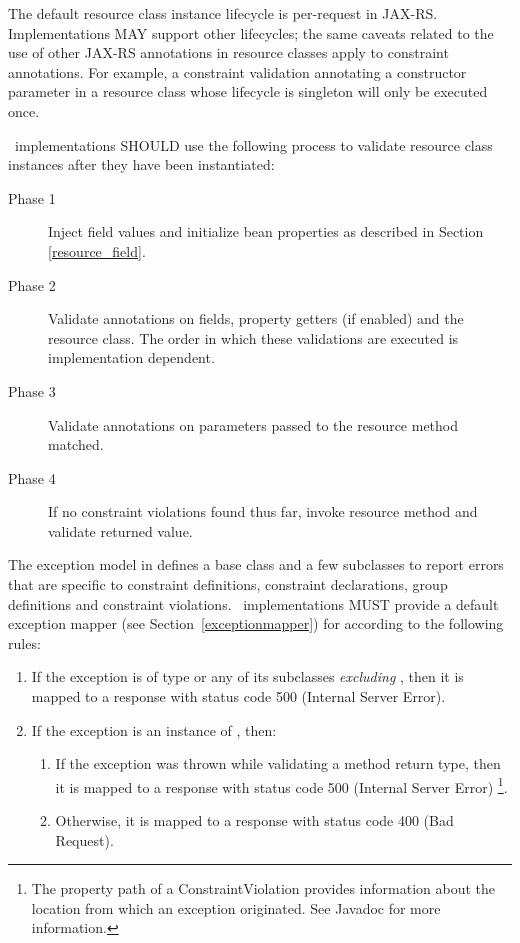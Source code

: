 The default resource class instance lifecycle is per-request in JAX-RS. Implementations MAY support other lifecycles; the same caveats related to the use of other JAX-RS annotations in resource classes apply to constraint annotations. For example, a constraint validation annotating a constructor parameter in a resource class whose lifecycle is singleton will only be executed once.

\jaxrs\ implementations SHOULD use the following process to validate resource class instances after they have been instantiated:

\begin{description}
\item[Phase 1] Inject field values and initialize bean properties as described in Section \ref{resource_field}.
\item[Phase 2] Validate annotations on fields, property getters (if enabled) and the resource class. The order in which these validations are executed is implementation dependent.
\item[Phase 3] Validate annotations on parameters passed to the resource method matched. 
\item[Phase 4] If no constraint violations found thus far, invoke resource method and validate returned value. 
\end{description}

The exception model in \cite{bv11} defines a base class  and a few subclasses to report errors that are specific to constraint definitions, constraint declarations, group definitions and constraint violations. \jaxrs\ implementations MUST provide a default exception mapper (see Section~\ref{exceptionmapper}) for  according to the following rules:

\begin{enumerate}
\item If the exception is of type  or any of its subclasses {\em excluding} , then it is mapped to a response with status code 500 (Internal Server Error).
\item If the exception is an instance of , then:
\begin{enumerate}
\item If the exception was thrown while validating a method return type, then it is mapped to a response with status code 500 (Internal Server Error) \footnote{The property path of a {\code ConstraintViolation} provides information about the location from which an exception originated. See Javadoc for more information.}.
\item Otherwise, it is mapped to a response with status code 400 (Bad Request). 
\end{enumerate}
\end{enumerate}

